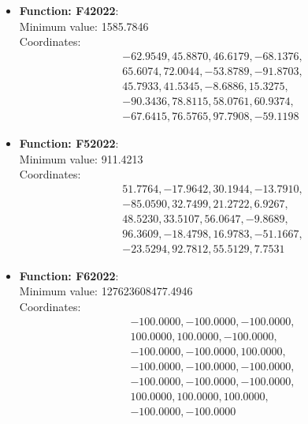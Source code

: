 \documentclass{article}
\begin{document}
\begin{itemize}
  \item \textbf{Function: F42022}: \\
    Minimum value: 1585.7846 \\
    Coordinates:
    \[
      \begin{aligned}
        & -62.9549, 45.8870, 46.6179, -68.1376, \\
        & 65.6074, 72.0044, -53.8789, -91.8703, \\
        & 45.7933, 41.5345, -8.6886, 15.3275, \\
        & -90.3436, 78.8115, 58.0761, 60.9374, \\
        & -67.6415, 76.5765, 97.7908, -59.1198
      \end{aligned}
    \]

  \item \textbf{Function: F52022}: \\
    Minimum value: 911.4213 \\
    Coordinates:
    \[
      \begin{aligned}
        & 51.7764, -17.9642, 30.1944, -13.7910, \\
        & -85.0590, 32.7499, 21.2722, 6.9267, \\
        & 48.5230, 33.5107, 56.0647, -9.8689, \\
        & 96.3609, -18.4798, 16.9783, -51.1667, \\
        & -23.5294, 92.7812, 55.5129, 7.7531
      \end{aligned}
    \]

  \item \textbf{Function: F62022}: \\
    Minimum value: 127623608477.4946 \\
    Coordinates:
    \[
      \begin{aligned}
        & -100.0000, -100.0000, -100.0000, \\
        & 100.0000, 100.0000, -100.0000, \\
        & -100.0000, -100.0000, 100.0000, \\
        & -100.0000, -100.0000, -100.0000, \\
        & -100.0000, -100.0000, -100.0000, \\
        & 100.0000, 100.0000, 100.0000, \\
        & -100.0000, -100.0000
      \end{aligned}
    \]


\end{itemize}
\end{document}
